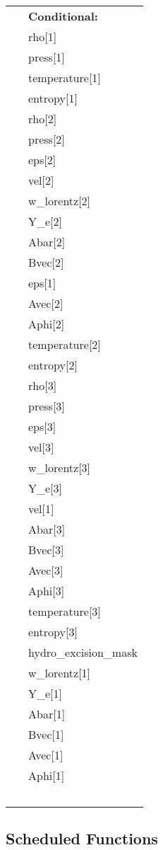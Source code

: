  \begin{tabular*}{160mm}{ll} 
~& {\bf Conditional:} \\ 
~ &  rho[1]\\ 
~ &  press[1]\\ 
~ &  temperature[1]\\ 
~ &  entropy[1]\\ 
~ &  rho[2]\\ 
~ &  press[2]\\ 
~ &  eps[2]\\ 
~ &  vel[2]\\ 
~ &  w\_lorentz[2]\\ 
~ &  Y\_e[2]\\ 
~ &  Abar[2]\\ 
~ &  Bvec[2]\\ 
~ &  eps[1]\\ 
~ &  Avec[2]\\ 
~ &  Aphi[2]\\ 
~ &  temperature[2]\\ 
~ &  entropy[2]\\ 
~ &  rho[3]\\ 
~ &  press[3]\\ 
~ &  eps[3]\\ 
~ &  vel[3]\\ 
~ &  w\_lorentz[3]\\ 
~ &  Y\_e[3]\\ 
~ &  vel[1]\\ 
~ &  Abar[3]\\ 
~ &  Bvec[3]\\ 
~ &  Avec[3]\\ 
~ &  Aphi[3]\\ 
~ &  temperature[3]\\ 
~ &  entropy[3]\\ 
~ &  hydro\_excision\_mask\\ 
~ &  w\_lorentz[1]\\ 
~ &  Y\_e[1]\\ 
~ &  Abar[1]\\ 
~ &  Bvec[1]\\ 
~ &  Avec[1]\\ 
~ &  Aphi[1]\\ 
~ & ~\\ 
\end{tabular*} 


\subsection*{Scheduled Functions}
\vspace{5mm}

